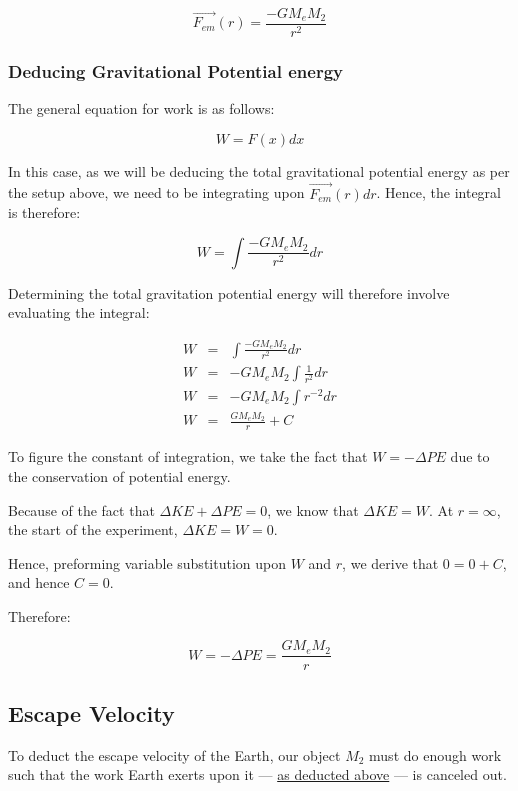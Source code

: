\documentclass[letterpaper]{article}
\begin{document}
\begin{equation}
\vec{F_{em}}(r) = \frac{-GM_eM_2}{r^2}
\end{equation}

\subsubsection{Deducing Gravitational Potential energy}
\label{sec:org418d9a0}

The general equation for work is as follows:

\begin{equation}
W = F(x) dx
\end{equation}

In this case, as we will be deducing the total gravitational potential energy as per the setup above, we need to be integrating upon \(\vec{F_{em}}(r) dr\). Hence, the integral is therefore:

\begin{equation}
W = \int{\frac{-GM_eM_2}{r^2} dr}
\end{equation}

Determining the total gravitation potential energy will therefore involve evaluating the integral:

\begin{eqnarray}
W &=& \int{\frac{-GM_eM_2}{r^2} dr} \\
W &=& -GM_eM_2 \int{\frac{1}{r^2} dr} \\
W &=& -GM_eM_2 \int{r^{-2} dr} \\
W &=& \frac{GM_eM_2}{r} + C
\end{eqnarray}

To figure the constant of integration, we take the fact that \(W=-\Delta PE\) due to the conservation of potential energy.

Because of the fact that \(\Delta KE + \Delta PE = 0\), we know that \(\Delta KE = W\). At \(r=\infty\), the start of the experiment, \(\Delta KE = W = 0\).

Hence, preforming variable substitution upon \(W\) and \(r\), we derive that \(0 = 0 + C\), and hence \(C=0\).

Therefore:

\begin{equation}
    W = -\Delta PE = \frac{GM_eM_2}{r} 
\end{equation}

\subsection{Escape Velocity}
\label{sec:org689a60b}
To deduct the escape velocity of the Earth, our object \(M_2\) must do enough work such that the work Earth exerts upon it --- \hyperref[sec:org418d9a0]{as deducted above} --- is canceled out.
\end{document}
